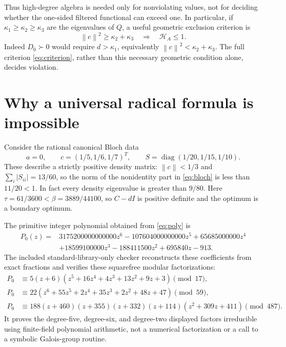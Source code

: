 \documentclass[11pt]{article}
\theoremstyle{remark}\newtheorem{remark}[theorem]{Remark}
\newcommand{\diag}{\operatorname{diag}}
\newcommand{\HF}{\mathcal H}
\newcommand{\norm}[1]{\left\lVert#1\right\rVert}
\begin{document}
Thus high-degree algebra is needed only for nonviolating values, not for
deciding whether the one-sided filtered functional can exceed one.
In particular, if $\kappa_1\geq\kappa_2\geq\kappa_3$ are the eigenvalues
of $Q$, a useful geometric exclusion criterion is
\begin{equation}\label{eq:exclusion}
 \norm c^2\geq\kappa_2+\kappa_3\quad\Longrightarrow\quad\HF_A\leq1.
\end{equation}
Indeed $D_0\succ0$ would require
$d>\kappa_1$, equivalently $\norm c^2<\kappa_2+\kappa_3$.
The full criterion \eqref{eq:criterion}, rather than this necessary
geometric condition alone, decides violation.

\section{Why a universal radical formula is impossible}\label{sec:galois}

Consider the rational canonical Bloch data
\begin{equation}\label{eq:galoisstate}
 a=0,\qquad c=(1/5,1/6,1/7)^T,\qquad
 S=\diag(1/20,1/15,1/10).
\end{equation}
These describe a strictly positive density matrix: $\norm c<1/3$ and
$\sum_i|S_{ii}|=13/60$, so the norm of the nonidentity part in
\eqref{eq:bloch} is less than $11/20<1$. In fact every density eigenvalue
is greater than $9/80$. Here
$\tau=61/3600<\beta=3889/44100$, so $C-dI$ is positive definite and the
optimum is a boundary optimum.

The primitive integer polynomial obtained from \eqref{eq:poly} is
\begin{align}\label{eq:integerpoly}
 P_0(z)={}&3175200000000000z^6-107604000000000z^5
 +65685000000z^4\nonumber\\
 &+18599100000z^3-188411500z^2+695840z-913.
\end{align}
The included standard-library-only checker reconstructs these coefficients
from exact fractions and verifies these squarefree modular factorizations:
\begin{align*}
 P_0&\equiv 5(z+6)(z^5+16z^4+4z^3+13z^2+9z+3)\pmod {17},\\
 P_0&\equiv 22(z^6+55z^5+2z^4+35z^3+2z^2+48z+47)\pmod {59},\\
 P_0&\equiv 188(z+460)(z+355)(z+332)(z+114)
 (z^2+309z+411)\pmod {487}.
\end{align*}
It proves the degree-five, degree-six, and degree-two displayed factors
irreducible using finite-field polynomial arithmetic, not a numerical
factorization or a call to a symbolic Galois-group routine.
\end{document}
